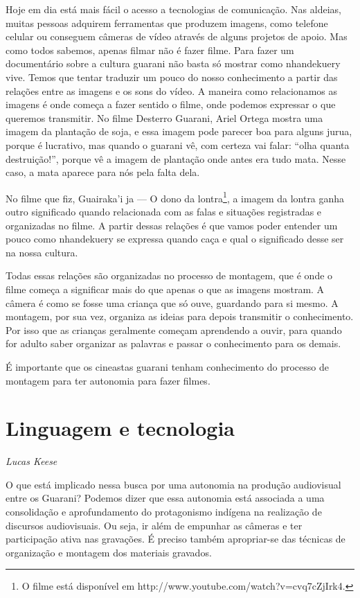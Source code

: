 Hoje em dia está mais fácil o acesso a tecnologias de comunicação. Nas
aldeias, muitas pessoas adquirem ferramentas que produzem imagens, como
telefone celular ou conseguem câmeras de vídeo através de alguns
projetos de apoio. Mas como todos sabemos, apenas filmar não é fazer
filme. Para fazer um documentário sobre a cultura guarani não basta só
mostrar como nhandekuery vive. Temos que tentar traduzir um pouco do
nosso conhecimento a partir das relações entre as imagens e os sons do
vídeo. A maneira como relacionamos as imagens é onde começa a fazer
sentido o filme, onde podemos expressar o que queremos transmitir. No
filme Desterro Guarani, Ariel Ortega mostra uma imagem da plantação de
soja, e essa imagem pode parecer boa para alguns jurua, porque é
lucrativo, mas quando o guarani vê, com certeza vai falar: ``olha quanta
destruição!'', porque vê a imagem de plantação onde antes era tudo mata.
Nesse caso, a mata aparece para nós pela falta dela. 

No filme que fiz, Guairaka’i ja --- O dono da lontra\footnote{O filme está
disponível em http://www.youtube.com/watch?v=cvq7cZjIrk4.},
a imagem da lontra ganha outro significado quando relacionada com as
falas e situações registradas e organizadas no filme. A partir dessas
relações é que vamos poder entender um pouco como nhandekuery se
expressa quando caça e qual o significado desse ser na nossa cultura. 

Todas essas relações são organizadas no processo de montagem, que é onde
o filme começa a significar mais do que apenas o que as imagens
mostram. A câmera é como se fosse uma criança que só ouve, guardando
para si mesmo. A montagem, por sua vez, organiza as ideias para depois
transmitir o conhecimento. Por isso que as crianças geralmente começam
aprendendo a ouvir, para quando for adulto saber organizar as palavras
e passar o conhecimento para os demais.

É importante que os cineastas guarani tenham conhecimento do processo de
montagem para ter autonomia para fazer filmes. 

\chapter{Linguagem e tecnologia}
\begin{flushright}
\emph{Lucas Keese}
\end{flushright}
\medskip

O que está implicado nessa busca por uma autonomia na produção
audiovisual entre os Guarani? Podemos dizer que essa autonomia está
associada a uma consolidação e aprofundamento do protagonismo indígena
na realização de discursos audiovisuais. Ou seja, ir além de empunhar
as câmeras e ter participação ativa nas gravações. É preciso também
apropriar-se das técnicas de organização e montagem dos materiais
gravados.

